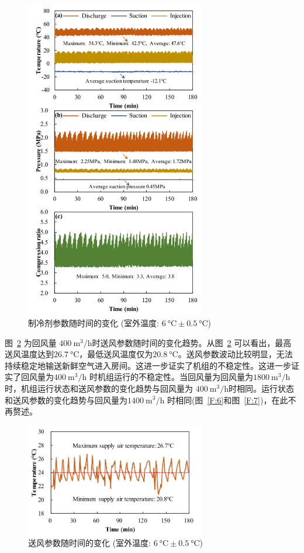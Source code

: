 \begin{figure}[htbp]
	\centering
	\includegraphics[width=0.7\textwidth]{figure/figure_13}
	\caption{制冷剂参数随时间的变化 (室外温度: $\qty{6}{\degreeCelsius} \pm \qty{0.5}{\degreeCelsius} $)}
	\label{F:13}
\end{figure}

图~\ref{F:14} 为回风量 $\qty{400}{\m^3/\hour} $时送风参数随时间的变化趋势。从图~\ref{F:14} 可以看出，最高送风温度达到$\qty{26.7}{\degreeCelsius} $，最低送风温度仅为$\qty{20.8}{\degreeCelsius} $。送风参数波动比较明显，无法持续稳定地输送新鲜空气进入房间。这进一步证实了机组的不稳定性。这进一步证实了回风量为$\qty{400}{\m^3/\hour} $ 时机组运行的不稳定性。当回风量为回风量为$\qty{1800}{\m^3/\hour} $时，机组运行状态和送风参数的变化趋势与回风量为 $\qty{400}{\m^3/\hour} $时相同。运行状态和送风参数的变化趋势与回风量为$\qty{1400}{\m^3/\hour} $ 时相同(图~\ref{F:6}和图~\ref{F:7})，在此不再赘述。

\begin{figure}[htbp]
	\centering
	\includegraphics[width=0.7\textwidth]{figure/figure_14}
	\caption{送风参数随时间的变化 (室外温度: $\qty{6}{\degreeCelsius} \pm \qty{0.5}{\degreeCelsius} $)}
	\label{F:14}
\end{figure}
 

